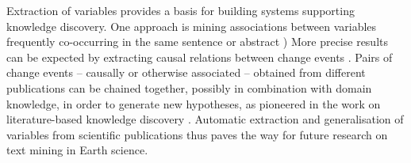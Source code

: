 \documentclass[11pt]{article}
\begin{document}

 
Extraction of variables provides a basis for building systems supporting knowledge discovery.
One approach is mining associations between variables frequently co-occurring in the same sentence or abstract \cite{Jenssen:2001aa,Hashimoto2012Excitatory}) 
More precise results can be expected by extracting causal relations between change events \cite{chang2005causal,blanco2008causal,Raja2013PPInterFindera}.
Pairs of change events -- causally or otherwise associated -- obtained from different publications can be chained together, possibly in combination with domain knowledge, in order to generate new hypotheses, as pioneered in the work on literature-based knowledge discovery \cite{Swanson1986Fish,Swa88,Swanson1997Interactive}.
Automatic extraction and generalisation of variables from scientific publications thus paves the way for future research on text mining in Earth science.
 
%


\vfill

\FloatBarrier 
\pagebreak



\end{document}

